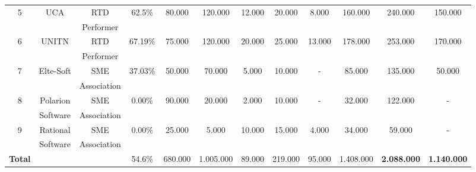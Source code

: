 \begin{center}
\begin{adjustbox}{width=1\textwidth}
\begin{tabular}{ |c|c|c|c|c|c|c|c|c|c|c|c|}
			5 & UCA & RTD & 62.5\% & 80.000 & 120.000 & 12.000 & 20.000 & 8.000 & 160.000 & 240.000 & 150.000 \\
			~ & ~ & Performer & ~ & ~ & ~ & ~ & ~ & ~ & ~ & ~ & \\
			\hline
			
			6 & UNITN & RTD & 67.19\% & 75.000 & 120.000 & 20.000 & 25.000 & 13.000 & 178.000 & 253.000 & 170.000 \\
			~ & ~ & Performer & ~ & ~ & ~ & ~ & ~ & ~ & ~ & ~ & \\
			\hline
			
			7 & Elte-Soft & SME & 37.03\% & 50.000 & 70.000 & 5.000 & 10.000 & - & 85.000 & 135.000 & 50.000 \\
			~ & ~ & Association & ~ & ~ & ~ & ~ & ~ & ~ & ~ & ~ & \\
			\hline
			
			8 & Polarion & SME & 0.00\% & 90.000 & 20.000 & 2.000 & 10.000 & - & 32.000 & 122.000 & - \\
			~ & Software & Association & ~ & ~ & ~ & ~ & ~ & ~ & ~ & ~ & \\
			\hline
			
			9 & Rational & SME & 0.00\% & 25.000 & 5.000 & 10.000 & 15.000 & 4.000 & 34.000 & 59.000 & - \\
			~ & Software & Association & ~ & ~ & ~ & ~ & ~ & ~ & ~ & ~ & \\
			\hline\hline\Large
			\textbf{Total} &  &  & 54.6\% & 680.000 & 1.005.000 & 89.000 & 219.000 & 95.000 & 1.408.000 &\Large\textbf{2.088.000} &\Large\textbf{1.140.000}
			\\\hline
		\end{tabular}
	\end{adjustbox}
\end{center}
